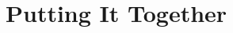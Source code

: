 \documentclass[aspectratio=169, 11pt]{beamer}
\newtheorem{propx}[theorem]{Proposition}
\newcommand{\srcline}[1]{%
  \par\vspace{0.25em}%
  {\scriptsize\color{mcMuted}\hfill #1\par}}
\newcommand{\figcap}[2][0.90]{%
  \begin{center}\begin{minipage}{#1\textwidth}\centering
    {\scriptsize\color{mcMuted} #2}
  \end{minipage}\end{center}}
\begin{document}


\section{Putting It Together}
\end{document}
